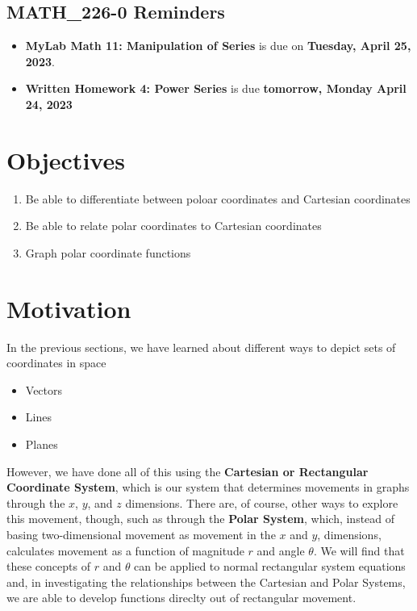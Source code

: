 \documentclass{report}
\begin{document}
\begin{sloppypar}
\begin{itemize}
\end{itemize}
\subsection{MATH\_226-0 Reminders}
\begin{itemize}
  \item \textbf{MyLab Math 11: Manipulation of Series}
        is due on \textbf{Tuesday, April 25, 2023}.
  \item \textbf{Written Homework 4: Power Series} is due
        \textbf{tomorrow, Monday April 24, 2023}
\end{itemize}



\section{Objectives}
\begin{enumerate}
  \item Be able to differentiate between poloar
        coordinates and Cartesian coordinates
  \item Be able to relate polar coordinates to
        Cartesian coordinates
  \item Graph polar coordinate functions

\end{enumerate}

\section{Motivation}
In the previous sections, we have
learned about different ways to depict
sets of coordinates in space
\begin{itemize}
  \item Vectors
  \item Lines
  \item Planes
\end{itemize}
However, we have done all of this using
the \textbf{Cartesian or Rectangular
  Coordinate System}, which is our
system that determines movements in
graphs through the $ x $, $ y$, and $ z$
dimensions. There are, of course,
other ways to explore this movement,
though, such as through the
\textbf{Polar System}, which,
instead of basing two-dimensional
movement as movement in the
$ x $ and $ y $, dimensions,
calculates movement as a function
of magnitude $ r $ and angle $ \theta $.
We will find that these concepts of
$ r $ and $ \theta $ can be
applied to normal rectangular
system equations and, in
investigating the relationships
between the Cartesian and Polar
Systems, we are able to
develop functions direclty
out of rectangular movement.



\end{sloppypar}
\end{document}
